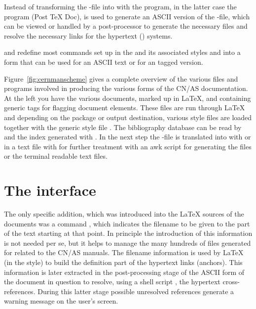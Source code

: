 Instead of transforming the \DVI-file
into \PS{} with the \DVIPS{} program, in the
latter case the program \PTD{} (Post \TeX{} Doc),
is used to generate an ASCII version of the \DVI-file,
which can be viewed or handled by a post-processor to
generate the necessary files and resolve the necessary links 
for the hypertext (\eg \WWW) systems.

 and 
redefine most  commands set up in the  and
its associated styles  and 
into a form that can be used for an ASCII text or for 
an \Html{} tagged version.

Figure~\vref{fig:cernmanscheme} gives a complete overview of the various files
and programs involved in producing the various forms
of the CN/AS documentation.
At the left you have the various documents, marked up in \LaTeX,
and containing generic tags for flagging document elements. 
These files are run through \LaTeX{} and depending on the
package or output destination, various style files are loaded
together with the generic style file .
The bibliography database  can be read
by \BibTeX{} and the index generated with \MakeIndex.
In the next step the \DVI-file is translated into \PS{}
with \DVIPS{} or in a text file with \PTD{} for further 
treatment with an awk script for generating the 
\Html{} files or the terminal readable text files.

\section{The \protect\Html{} interface}

The only \Html{} specific addition, which was introduced into
the \LaTeX{} sources of the documents was a command ,
which indicates the filename to be given to the part of the text
starting at that point.
In principle the introduction of this information is not needed per se,
but it helps to manage the many hundreds of files generated for \WWW{} 
related to the CN/AS manuals.
The filename information is used by \LaTeX{} (in the 
style) to build the definition part of the hypertext links (anchors).
This information is later extracted in the post-processing stage 
of the ASCII form of the document in question to resolve,
using a shell script ,
the hypertext cross-references.
During this latter stage possible unresolved references generate a
warning message on the user's screen.

